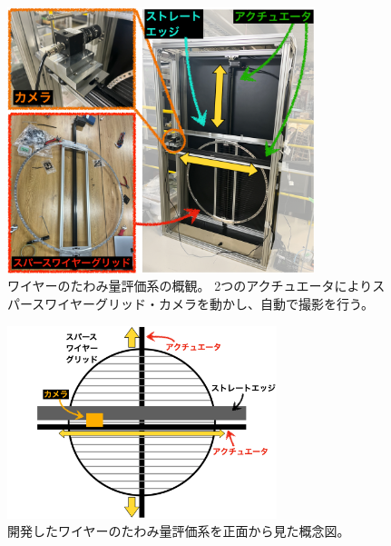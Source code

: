 \documentclass[../../main.tex]{subfiles}
\begin{document}
\begin{figure}[H]
    \centering
    \includegraphics[width=0.8\textwidth]{wiresag/wiresag_system.pdf}
    \caption{ワイヤーのたわみ量評価系の概観。
    2つのアクチュエータによりスパースワイヤーグリッド・カメラを動かし、自動で撮影を行う。}
    \label{fig:wiresag_system}
\end{figure}
\begin{figure}[H]
    \centering
    \includegraphics[width=0.7\textwidth]{wiresag/wiresag_system_front.pdf}
    \caption{開発したワイヤーのたわみ量評価系を正面から見た概念図。}
    \label{fig:wiresag_system_front}
\end{figure}
\end{document}
